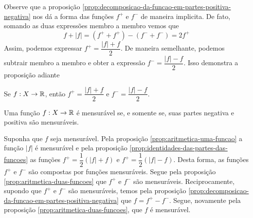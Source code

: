     Observe que a proposição \ref{prop:decomposicao-da-funcao-em-partes-positiva-negativa} nos dá a forma das funções $f^+$ e $f^-$ de maneira implicita.
    De fato, somando as duas expressões membro a membro vemos que 
    $$f + |f| = (f^+ + f^+) - (f^- + f^-) = 2f^+$$
    Assim, podemos expressar $f^+ = \dfrac{|f| + f}{2}$.
    De maneira semelhante, podemos subtrair membro a membro e obter a expressão $f^- = \dfrac{|f| - f}{2}$. 
    Isso demonstra a proposição adiante

    \begin{proposition}
    \label{prop:identidades-das-partes-das-funcoes}
        Se $f: X \to \mathbb{R}$, então $f^+ = \dfrac{|f| + f}{2}$ e $f^- = \dfrac{|f| - f}{2}$.
    \end{proposition}

    \begin{theorem}
        Uma função $f: X \to \mathbb{R}$ é mensurável se, e somente se, suas partes negativa e positiva são mensuráveis. 
    \end{theorem}

    \begin{prova}
        Suponha que $f$ seja mensurável. Pela proposição \ref{prop:aritmetica-uma-funcao} a função $|f|$ é mensurável e pela proposição \ref{prop:identidades-das-partes-das-funcoes} as funções $f^+ = \dfrac{1}{2}(|f| + f)$ e $f^+ = \dfrac{1}{2}(|f| - f)$.
        Desta forma, as funções $f^+$ e $f^-$ são compostas por funções mensuráveis.
        Segue pela proposição \ref{prop:aritmetica-duas-funcoes} que $f^+$ e $f^-$ são mensuráveis.
        Reciprocamente, supondo que $f^+$ e $f^-$ são mensuráveis, temos pela proposição \ref{prop:decomposicao-da-funcao-em-partes-positiva-negativa} que
        $f = f^+ - f^-$. Segue, novamente pela proposição \ref{prop:aritmetica-duas-funcoes}, que $f$ é mensurável. 
    \end{prova}


                            
